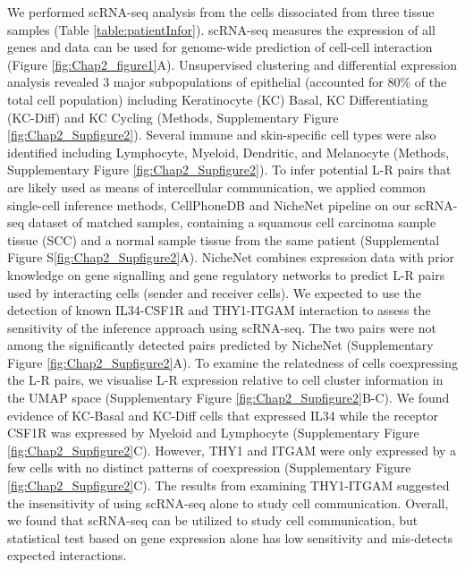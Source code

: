 We performed scRNA-seq analysis from the cells dissociated from three tissue samples (Table \ref{table:patientInfor}). scRNA-seq measures the expression of all genes and data can be used for genome-wide prediction of cell-cell interaction (Figure \ref{fig:Chap2_figure1}A). Unsupervised clustering and differential expression analysis revealed 3 major subpopulations of epithelial (accounted for 80\% of the total cell population) including Keratinocyte (KC) Basal, KC Differentiating (KC-Diff) and KC Cycling (Methods, Supplementary Figure \ref{fig:Chap2_Supfigure2}). Several immune and skin-specific cell types were also identified including Lymphocyte, Myeloid, Dendritic, and Melanocyte (Methods, Supplementary Figure \ref{fig:Chap2_Supfigure2}). To infer potential L-R pairs that are likely used as means of intercellular communication, we applied common single-cell inference methods, CellPhoneDB \cite{efremova2020cellphonedb} and NicheNet pipeline \cite{browaeys2020nichenet} on our scRNA-seq dataset of matched samples, containing a squamous cell carcinoma sample tissue (SCC)  and a normal sample tissue from the same patient (Supplemental Figure S\ref{fig:Chap2_Supfigure2}A). NicheNet combines expression data with prior knowledge on gene signalling and gene regulatory networks to predict L-R pairs used by interacting cells (sender and receiver cells). We expected to use the detection of known IL34-CSF1R \cite{lin2008discovery} and THY1-ITGAM \cite{wetzel2004human} interaction to assess the sensitivity of the inference approach using scRNA-seq. The two pairs were not among the significantly detected pairs predicted by NicheNet (Supplementary Figure \ref{fig:Chap2_Supfigure2}A). To examine the relatedness of cells coexpressing the L-R pairs, we visualise L-R expression relative to cell cluster information in the UMAP space (Supplementary Figure \ref{fig:Chap2_Supfigure2}B-C). We found evidence of KC-Basal and KC-Diff cells that expressed IL34 while the receptor CSF1R was expressed by Myeloid and Lymphocyte (Supplementary Figure \ref{fig:Chap2_Supfigure2}C). However, THY1 and ITGAM were only expressed by a few cells with no distinct patterns of coexpression (Supplementary Figure \ref{fig:Chap2_Supfigure2}C). The results from examining THY1-ITGAM suggested the insensitivity of using scRNA-seq alone to study cell communication. Overall, we found that scRNA-seq can be utilized to study cell communication, but statistical test based on gene expression alone has low sensitivity and mis-detects expected interactions.  

